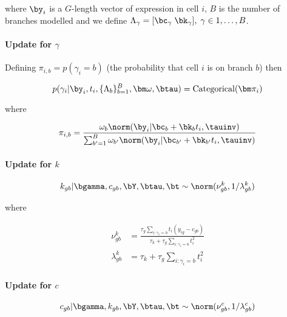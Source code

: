 where $\by_i$ is a $G$-length vector of expression in cell $i$, $B$ is the number of branches modelled and we define $\Lambda_\gamma = [ \bc_\gamma \; \bk_\gamma], \; \gamma \in 1, \ldots, B$.

\paragraph{Update for $\gamma$}

Defining $\pi_{i,b} = p(\gamma_i = b)$ (the probability that cell $i$ is on branch $b$) then

\begin{equation}
  p(\gamma_i | \by_i, t_i, \{ \Lambda_b \}_{b=1}^B, \bm \omega, \btau) = \text{Categorical}(\bm \pi_{i})
\end{equation}

where

\begin{equation}
  \pi_{i,b} = \frac{\omega_b \norm(\by_i | \bc_b + \bk_b t_i, \tauinv)}
  {\sum_{b'=1}^B \omega_{b'} \norm(\by_i | \bc_{b'} + \bk_{b'} t_i, \tauinv) }
\end{equation}

\paragraph{Update for $k$}

\begin{equation}
  k_{gb} | \bgamma, c_{gb}, \bY, \btau, \bt \sim \norm(\nu^k_{gb}, 1 / \lambda^k_{gb})
\end{equation}

where

\begin{equation}
\begin{aligned}
\nu^k_{gb} & = \frac{\tau_g \sum_{i:\gamma_i = b}  t_i (y_{ig} - c_{gb})}{\tau_k +  \tau_g \sum_{i:\gamma_i = b}  t_i^2}\\
\lambda^k_{gb} & = \tau_k +  \tau_g \sum_{i:\gamma_i = b}  t_i^2
\end{aligned}
\end{equation}

\paragraph{Update for $c$}

\begin{equation}
  c_{gb} | \bgamma, k_{gb}, \bY, \btau, \bt \sim \norm(\nu^c_{gb}, 1 / \lambda^c_{gb})
\end{equation}

